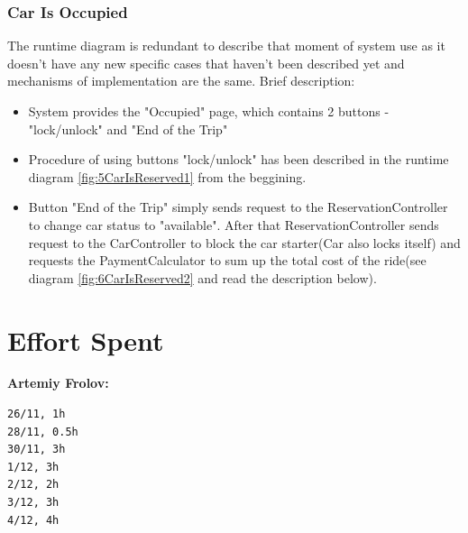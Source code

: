 \documentclass[12pt, letterpaper]{article}
\begin{document}
\subsubsection{Car Is Occupied}
The runtime diagram is redundant to describe that moment of system use as it doesn't have any new specific cases that haven't been described yet and mechanisms of implementation are the same.
Brief description:
\begin{itemize}
	\item System provides the "Occupied" page, which contains 2 buttons - "lock/unlock" and "End of the Trip"
	\item Procedure of using buttons "lock/unlock" has been described in the runtime diagram \ref{fig:5CarIsReserved1} from the beggining.
	\item Button "End of the Trip" simply sends request to the ReservationController to change car status to "available". After that ReservationController sends request to the CarController to block the car starter(Car also locks itself) and requests the PaymentCalculator to sum up the total cost of the ride(see diagram \ref{fig:6CarIsReserved2} and read the description below).
\end{itemize}  
\newpage













\newpage
\section {Effort Spent} 
\textbf{Artemiy Frolov:}
\begin{verbatim}
26/11, 1h
28/11, 0.5h
30/11, 3h
1/12, 3h
2/12, 2h
3/12, 3h
4/12, 4h
\end{verbatim} 

\newpage
\end{document}
